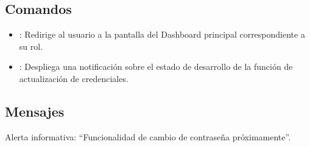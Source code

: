 \subsection{Comandos}
	\begin{itemize}
		\item {}: Redirige al usuario a la pantalla del Dashboard principal correspondiente a su rol.
		\item {}: Despliega una notificación sobre el estado de desarrollo de la función de actualización de credenciales.
	\end{itemize}

\subsection{Mensajes}
	\begin{Citemize}
		\item Alerta informativa: ``Funcionalidad de cambio de contraseña próximamente''.
	\end{Citemize}
